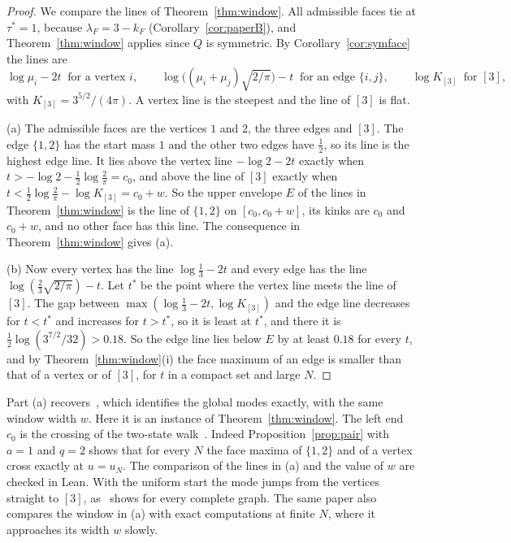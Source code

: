 \begin{proof}
We compare the lines of Theorem~\ref{thm:window}. All admissible faces tie at $\tau^*=1$,
because $\lambda_F=3-k_F$ (Corollary~\ref{cor:paperB}), and Theorem~\ref{thm:window} applies
since $Q$ is symmetric. By Corollary~\ref{cor:symface} the lines are
\[
\log\mu_i-2t\ \text{ for a vertex }i,\qquad
\log\bigl((\mu_i+\mu_j)\sqrt{2/\pi}\bigr)-t\ \text{ for an edge }\{i,j\},\qquad
\log K_{[3]}\ \text{ for }[3],
\]
with $K_{[3]}=3^{5/2}/(4\pi)$. A vertex line is the steepest and the line of $[3]$ is flat.

(a) The admissible faces are the vertices $1$ and $2$, the three edges and $[3]$. The edge
$\{1,2\}$ has the start mass $1$ and the other two edges have $\frac12$, so its line is the
highest edge line. It lies above the vertex line $-\log2-2t$ exactly when
$t>-\log2-\frac12\log\frac2\pi=c_0$, and above the line of $[3]$ exactly when
$t<\frac12\log\frac2\pi-\log K_{[3]}=c_0+w$. So the upper envelope $E$ of the
lines in Theorem~\ref{thm:window} is the line of $\{1,2\}$ on $[c_0,c_0+w]$,
its kinks are $c_0$ and $c_0+w$, and no other face has this line. The consequence in
Theorem~\ref{thm:window} gives (a).

(b) Now every vertex has the line $\log\frac13-2t$ and every edge has the line
$\log(\frac23\sqrt{2/\pi})-t$. Let $t^*$ be the point where the vertex line meets the line of
$[3]$. The gap between $\max(\log\frac13-2t,\log K_{[3]})$ and the edge line decreases for $t<t^*$
and increases for $t>t^*$, so it is least at $t^*$, and there it is
$\frac12\log(3^{7/2}/32)>0.18$. So the edge line lies below $E$ by at least $0.18$ for every $t$,
and by Theorem~\ref{thm:window}(i) the face maximum of an edge is smaller than that of a vertex
or of $[3]$, for $t$ in a compact set and large $N$.
\end{proof}

Part (a) recovers~\cite[Example~4.9]{paperB}, which identifies the global modes
exactly, with the same window width $w$. Here it is an instance of
Theorem~\ref{thm:window}. The left end $c_0$ is the crossing of the two-state walk~\cite{paperA}. Indeed Proposition~\ref{prop:pair} with $a=1$ and
$q=2$ shows that for every $N$ the face maxima of $\{1,2\}$ and of a vertex cross exactly at
$u=u_N$. The comparison of the lines in (a) and the value of $w$ are checked in Lean. With the
uniform start the mode jumps from the vertices straight to $[3]$, as~\cite{paperB} shows for every
complete graph. The same paper also compares the window in (a) with exact computations at
finite $N$, where it approaches its width $w$ slowly.

